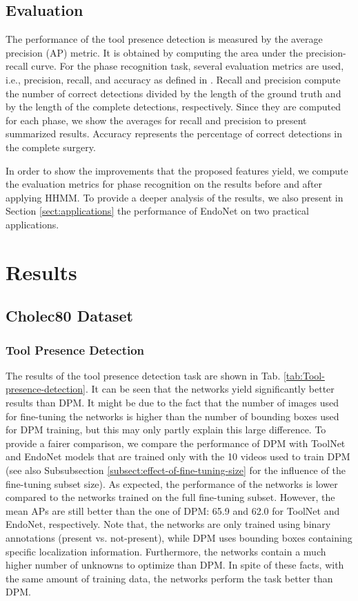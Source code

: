 \documentclass[journal]{IEEEtran} \usepackage{amssymb}
\begin{document}
\subsection{Evaluation}

The performance of the tool presence detection is measured by the
average precision (AP) metric. It is obtained by computing the area under the precision-recall curve. For the phase recognition task, several
evaluation metrics are used, i.e., precision, recall, and accuracy as defined in \cite{padoy_mia2012}. 
Recall and precision compute the number of correct detections divided 
by the length of the ground truth and by the length of the complete detections, respectively. 
Since they are computed for each phase, we show the averages for recall and 
precision to present summarized results. Accuracy represents the percentage of 
correct detections in the complete surgery. 

In order to show the improvements that the proposed features yield, we compute the evaluation metrics for phase recognition on the results before and after applying HHMM. To provide a deeper analysis of the results, we also present in Section \ref{sect:applications} the performance of EndoNet on two practical applications. 


\section{Results}
\label{sec:Exps}

\subsection{Cholec80 Dataset}

\subsubsection{\textbf{Tool Presence Detection}} The results of the tool presence detection task are shown in Tab. \ref{tab:Tool-presence-detection}.
It can be seen 
that the networks yield significantly better results than DPM. 
It might be due to the fact that the number of images used for fine-tuning the networks is higher than the number of bounding boxes used for DPM training, but this may only partly explain this large difference. To provide a fairer comparison, we compare the performance of DPM with ToolNet and EndoNet models that are trained only with the 10 videos used to train DPM (see also Subsubsection \ref{subsect:effect-of-fine-tuning-size} for the influence of the fine-tuning subset size). As expected, the performance of the networks is lower compared to the networks trained on the full fine-tuning subset. However, the mean APs are still better than the one of DPM: 65.9 and 62.0 for ToolNet and EndoNet, respectively.  Note that, the networks are only trained using binary annotations (present vs. not-present), while DPM uses bounding boxes containing specific localization  information. Furthermore, the networks contain a much higher number of unknowns to optimize than DPM. In spite of these facts, with the same amount of training data, the networks perform the task better than DPM.
\end{document}

